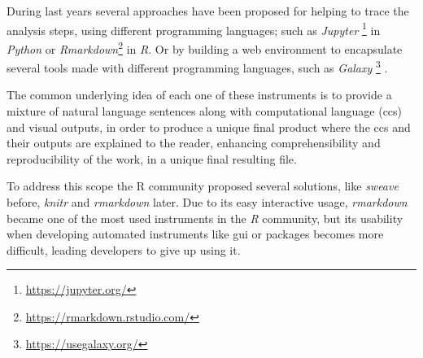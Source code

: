 During last years several approaches \cite{russo2015advantages} have been proposed for helping to trace the analysis steps, using different programming languages; such as  \textit{Jupyter} \footnote{\url{https://jupyter.org/}} \cite{Kluyver2016} in \textit{Python} or \textit{Rmarkdown}\footnote{\url{https://rmarkdown.rstudio.com/}} in \textit{R}.
Or by building a web environment to encapsulate several tools made with different programming languages, such as \textit{Galaxy} \footnote{\url{https://usegalaxy.org/}} \cite{Blankenberg2010, Giardine2005, Goecks2010}.

The common underlying idea of each one of these instruments is to provide a mixture of natural language sentences along with computational language (\glspl{cc}) and visual outputs, in order to produce a unique final product where the \glspl{cc} and their outputs are explained to the reader, enhancing comprehensibility and reproducibility of the work, in a unique final resulting file.

To address this scope the R community proposed several solutions, like \textit{sweave} before, \textit{knitr} and \textit{rmarkdown} later.
Due to its easy interactive usage, \textit{rmarkdown} became one of the most used instruments in the \textit{R} community, but its usability when developing automated instruments like \gls{gui} or packages becomes more difficult, leading developers to give up using it.
